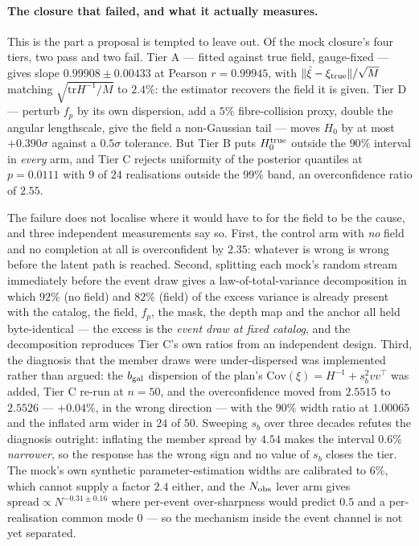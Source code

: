 \documentclass[11pt]{article}
\theoremstyle{definition}
\theoremstyle{remark}
\newcommand{\bgal}{b_{\rm gal}}
\newcommand{\tr}{\mathrm{tr}}
\begin{document}
\paragraph{The closure that failed, and what it actually measures.} This is the
part a proposal is tempted to leave out. Of the mock closure's four tiers, two
pass and two fail. Tier A --- fitted against true field, gauge-fixed --- gives
slope $0.99908\pm0.00433$ at Pearson $r=0.99945$, with
$\|\hat\xi-\xi_{\rm true}\|/\sqrt M$ matching $\sqrt{\tr H^{-1}/M}$ to $2.4\%$:
the estimator recovers the field it is given. Tier D --- perturb $f_p$ by its own
dispersion, add a $5\%$ fibre-collision proxy, double the angular lengthscale,
give the field a non-Gaussian tail --- moves $H_0$ by at most $+0.390\sigma$
against a $0.5\sigma$ tolerance. But Tier B puts $H_0^{\rm true}$ outside the
$90\%$ interval in \emph{every} arm, and Tier C rejects uniformity of the
posterior quantiles at $p=0.0111$ with $9$ of $24$ realisations outside the $99\%$
band, an overconfidence ratio of $2.55$.

The failure does not localise where it would have to for the field to be the
cause, and three independent measurements say so. First, the control arm with
\emph{no} field and no completion at all is overconfident by $2.35$: whatever is
wrong is wrong before the latent path is reached. Second, splitting each mock's
random stream immediately before the event draw gives a law-of-total-variance
decomposition in which $92\%$ (no field) and $82\%$ (field) of the excess
variance is already present with the catalog, the field, $f_p$, the mask, the
depth map and the anchor all held byte-identical --- the excess is the
\emph{event draw at fixed catalog}, and the decomposition reproduces Tier C's own
ratios from an independent design. Third, the diagnosis that the member draws
were under-dispersed was implemented rather than argued: the $\bgal$
dispersion of the plan's $\mathrm{Cov}(\xi)=H^{-1}+s_b^2vv^{\!\top}$ was added,
Tier C re-run at $n=50$, and the overconfidence moved from $2.5515$ to
$2.5526$ --- $+0.04\%$, in the wrong direction --- with the $90\%$ width ratio at
$1.00065$ and the inflated arm wider in $24$ of $50$. Sweeping $s_b$ over three
decades refutes the diagnosis outright: inflating the member spread by $4.54$
makes the interval $0.6\%$ \emph{narrower}, so the response has the wrong sign
and no value of $s_b$ closes the tier. The mock's own synthetic
parameter-estimation widths are calibrated to $6\%$, which cannot supply a factor
$2.4$ either, and the $N_{\rm obs}$ lever arm gives
$\mathrm{spread}\propto N^{-0.31\pm0.16}$ where per-event over-sharpness would
predict $0.5$ and a per-realisation common mode $0$ --- so the mechanism inside
the event channel is not yet separated.
\end{document}
